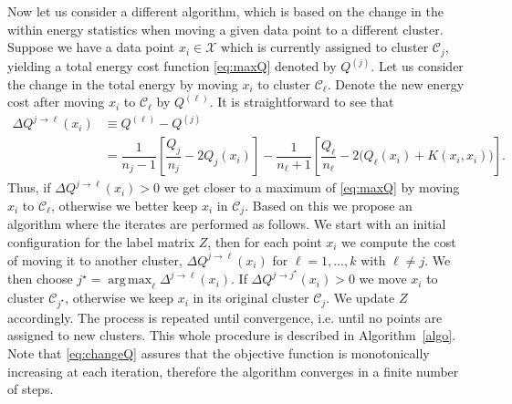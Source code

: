 \documentclass[aps,preprint,nofootinbib,floatfix]{revtex4-1}
\DeclareMathOperator*{\argmax}{arg\,max}
\newcommand\kk{K}
\newcommand\C{{\mathcal{C}}}
\begin{document}
Now let us consider a different algorithm, which is based on the change
in the within energy statistics when moving a given data point to
a different cluster.
Suppose we have a data point $x_i \in \mathcal{X}$
which is currently assigned to  cluster $\C_j$, yielding
a total energy cost function \eqref{eq:maxQ} denoted by $Q^{(j)}$.
Let us consider the change in the total energy by moving
$x_i$ to cluster $\C_\ell$. 
Denote the new energy cost after moving $x_i$ to $\C_\ell$ by $Q^{(\ell)}$.
It is straightforward to see that
\begin{equation}
\label{eq:changeQ}
\begin{split}
\Delta Q^{j \to \ell}(x_i) &\equiv Q^{(\ell)} - Q^{(j)} \\ 
&= 
\dfrac{1}{n_j - 1}\left[ \dfrac{Q_j}{n_j} - 2 Q_j(x_i) \right]
- \dfrac{1}{n_\ell + 1}\left[ \dfrac{Q_\ell}{n_\ell} - 2 \big(Q_\ell(x_i) + 
\kk(x_i,x_i)\big) 
\right].
\end{split}
\end{equation}
Thus, if $\Delta Q^{j\to \ell}(x_i) > 0$ we get closer to a 
maximum of \eqref{eq:maxQ} by
moving $x_i$ to $\C_\ell$, otherwise we better keep $x_i$ in $\C_j$. Based on
this we propose an algorithm where
the iterates are performed as follows.
We start with an initial configuration for the label matrix $Z$, 
then for each
point $x_i$ 
we compute the cost of moving it to another cluster,
$\Delta Q^{j\to \ell}(x_i)$ for 
$\ell=1,\dots,k$ with $\ell \ne j$. 
We then choose $j^\star = \argmax_\ell \Delta^{j \to \ell}(x_i)$.
If $\Delta Q^{j \to j^\star}(x_i) > 0$ 
we move $x_i$ to cluster $\C_{j^\star}$, otherwise 
we keep $x_i$ in its original cluster $\C_j$. We update $Z$ accordingly.
The process is repeated
until convergence, i.e. until no points are assigned to new clusters. 
This whole procedure is described in Algorithm~\ref{algo}.
Note that \eqref{eq:changeQ} assures that the objective function is
monotonically increasing at each iteration, therefore the algorithm
converges in a finite number of steps.
\end{document}

